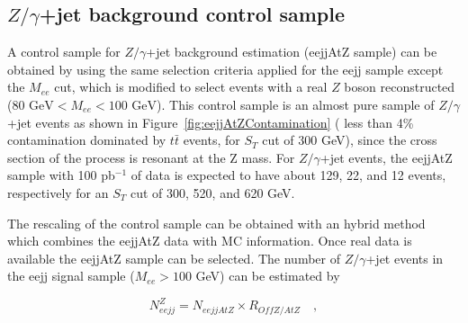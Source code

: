 \subsection{$Z/\gamma$+jet background control sample} \label{sec:ZcontrolSample}

A control sample for $Z/\gamma$+jet background estimation (eejjAtZ sample) 
can be obtained by using the same selection criteria applied for the eejj sample except 
the $M_{ee}$ cut, which is modified to select events with a real $Z$ boson reconstructed 
($80\mbox{ GeV} < M_{ee} < 100\mbox{ GeV}$). This control sample is an almost pure sample of  
$Z/\gamma$+jet events as shown in Figure~\ref{fig:eejjAtZContamination}   
( less than 4\% contamination dominated by $t\bar{t}$ events, for $S_{T}$ cut of 300 GeV), 
since the cross section of the process is resonant at the Z mass. 
For $Z/\gamma$+jet events, the eejjAtZ sample with 100 pb$^{-1}$ of data 
is expected to have about 129, 22, and 12 events, respectively for an $S_{T}$ cut of 300, 520, and 620 GeV.

The rescaling of the control sample can be obtained with an hybrid method which combines the eejjAtZ data with 
MC information. Once real data is available the eejjAtZ sample can be selected. 
The number of $Z/\gamma$+jet events in the eejj signal sample ($M_{ee}>100$ GeV) can be estimated by

\begin{equation} \label{formula:NeejFromNemujj}
N_{eejj}^{Z} = N_{eejjAtZ} \times R_{OffZ/AtZ} \quad , 
\end{equation}

